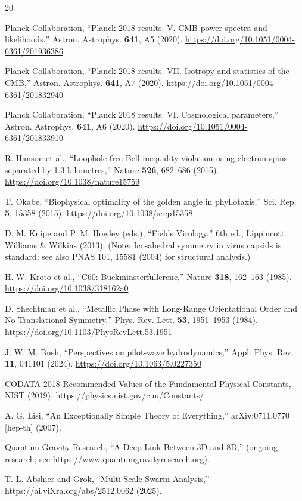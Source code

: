\documentclass[11pt,a4paper]{article}
\begin{document}
\begin{thebibliography}{20}

Planck Collaboration,
``Planck 2018 results. V. CMB power spectra and likelihoods,''
Astron. Astrophys. \textbf{641}, A5 (2020).
\url{https://doi.org/10.1051/0004-6361/201936386}

Planck Collaboration,
``Planck 2018 results. VII. Isotropy and statistics of the CMB,''
Astron. Astrophys. \textbf{641}, A7 (2020).
\url{https://doi.org/10.1051/0004-6361/201832940}

Planck Collaboration,
``Planck 2018 results. VI. Cosmological parameters,''
Astron. Astrophys. \textbf{641}, A6 (2020).
\url{https://doi.org/10.1051/0004-6361/201833910}

R. Hanson et al.,
``Loophole-free Bell inequality violation using electron spins separated by 1.3 kilometres,''
Nature \textbf{526}, 682--686 (2015).
\url{https://doi.org/10.1038/nature15759}

T. Okabe,
``Biophysical optimality of the golden angle in phyllotaxis,''
Sci. Rep. \textbf{5}, 15358 (2015).
\url{https://doi.org/10.1038/srep15358}

D. M. Knipe and P. M. Howley (eds.),
``Fields Virology,''
6th ed., Lippincott Williams \& Wilkins (2013).
(Note: Icosahedral symmetry in virus capsids is standard; see also PNAS 101, 15581 (2004) for structural analysis.)

H. W. Kroto et al.,
``C60: Buckminsterfullerene,''
Nature \textbf{318}, 162--163 (1985).
\url{https://doi.org/10.1038/318162a0}

D. Shechtman et al.,
``Metallic Phase with Long-Range Orientational Order and No Translational Symmetry,''
Phys. Rev. Lett. \textbf{53}, 1951--1953 (1984).
\url{https://doi.org/10.1103/PhysRevLett.53.1951}

J. W. M. Bush,
``Perspectives on pilot-wave hydrodynamics,''
Appl. Phys. Rev. \textbf{11}, 041101 (2024).
\url{https://doi.org/10.1063/5.0227350}

CODATA 2018 Recommended Values of the Fundamental Physical Constants,
NIST (2019).
\url{https://physics.nist.gov/cuu/Constants/}

A. G. Lisi,
``An Exceptionally Simple Theory of Everything,''
arXiv:0711.0770 [hep-th] (2007).

Quantum Gravity Research,
``A Deep Link Between 3D and 8D,''
(ongoing research; see https://www.quantumgravityresearch.org).

T. L. Abshier and Grok,
``Multi-Scale Swarm Analysis,''
https://ai.viXra.org/abs/2512.0062 (2025).

\end{thebibliography}
\end{document}
